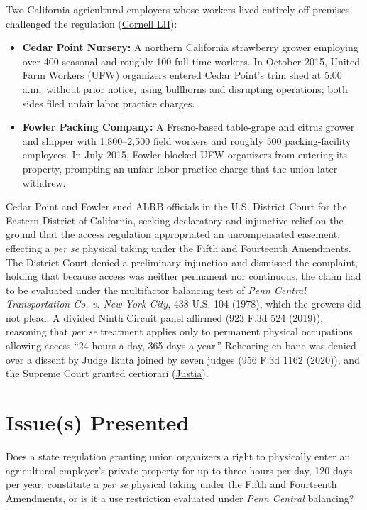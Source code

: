 \documentclass[12pt]{article}
\begin{document}
Two California agricultural employers whose workers lived entirely off-premises challenged the regulation (\href{https://www.law.cornell.edu/supremecourt/text/20-107}{Cornell LII}):
\begin{itemize}
    \item \textbf{Cedar Point Nursery:} A northern California strawberry grower employing over 400 seasonal and roughly 100 full-time workers. In October 2015, United Farm Workers (UFW) organizers entered Cedar Point's trim shed at 5:00 a.m.\ without prior notice, using bullhorns and disrupting operations; both sides filed unfair labor practice charges.
    \item \textbf{Fowler Packing Company:} A Fresno-based table-grape and citrus grower and shipper with 1,800--2,500 field workers and roughly 500 packing-facility employees. In July 2015, Fowler blocked UFW organizers from entering its property, prompting an unfair labor practice charge that the union later withdrew.
\end{itemize}

Cedar Point and Fowler sued ALRB officials in the U.S. District Court for the Eastern District of California, seeking declaratory and injunctive relief on the ground that the access regulation appropriated an uncompensated easement, effecting a \emph{per se} physical taking under the Fifth and Fourteenth Amendments. The District Court denied a preliminary injunction and dismissed the complaint, holding that because access was neither permanent nor continuous, the claim had to be evaluated under the multifactor balancing test of \textit{Penn Central Transportation Co. v. New York City}, 438 U.S. 104 (1978), which the growers did not plead. A divided Ninth Circuit panel affirmed (923 F.3d 524 (2019)), reasoning that \emph{per se} treatment applies only to permanent physical occupations allowing access ``24 hours a day, 365 days a year.'' Rehearing en banc was denied over a dissent by Judge Ikuta joined by seven judges (956 F.3d 1162 (2020)), and the Supreme Court granted certiorari (\href{https://supreme.justia.com/cases/federal/us/594/20-107/}{Justia}).

\section{Issue(s) Presented}

Does a state regulation granting union organizers a right to physically enter an agricultural employer's private property for up to three hours per day, 120 days per year, constitute a \emph{per se} physical taking under the Fifth and Fourteenth Amendments, or is it a use restriction evaluated under \textit{Penn Central} balancing?
\end{document}
